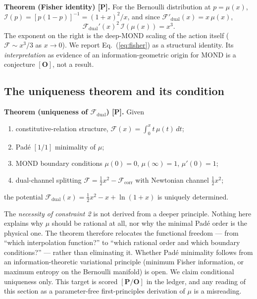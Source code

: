 \documentclass[aps,prd,preprint,superscriptaddress,nofootinbib,amsmath,amssymb,floatfix]{revtex4-2}
\begin{document}
\textbf{Theorem (Fisher identity) [P].} For the Bernoulli distribution at $p = \mu(x)$, $\mathcal{I}(p) = [p(1-p)]^{-1} = (1+x)^2/x$, and since $\mathcal{F}'_{\text{dual}}(x) = x\,\mu(x)$,
\begin{equation}
\label{eq:fisher}
\mathcal{F}_{\text{dual}}'(x)^2\,\mathcal{I}(\mu(x)) = x^3 .
\end{equation}
The exponent on the right is the deep-MOND scaling of the action itself ($\mathcal{F}\sim x^3/3$ as $x\to0$). We report Eq.~(\ref{eq:fisher}) as a structural identity. Its \emph{interpretation} as evidence of an information-geometric origin for MOND is a conjecture $\mathbf{[O]}$, not a result.

\subsection{The uniqueness theorem and its condition}

\textbf{Theorem (uniqueness of $\mathcal{F}_{\text{dual}}$) [P].} Given
\begin{enumerate}
    \item constitutive-relation structure, $\mathcal{F}(x) = \int_0^x t\,\mu(t)\,dt$;
    \item Pad\'e $[1/1]$ minimality of $\mu$;
    \item MOND boundary conditions $\mu(0)=0$, $\mu(\infty)=1$, $\mu'(0)=1$;
    \item dual-channel splitting $\mathcal{F} = \tfrac{1}{2}x^2 - \mathcal{F}_{\text{corr}}$ with Newtonian channel $\tfrac{1}{2}x^2$;
\end{enumerate}
the potential $\mathcal{F}_{\text{dual}}(x) = \tfrac{1}{2}x^2 - x + \ln(1+x)$ is uniquely determined.

\begin{tcolorbox}[colback=boxbg,colframe=primary,title=\textbf{What this theorem does not claim $\mathbf{[O]}$}]
The \emph{necessity of constraint 2} is not derived from a deeper principle. Nothing here explains why $\mu$ should be rational at all, nor why the minimal Pad\'e order is the physical one. The theorem therefore relocates the functional freedom --- from ``which interpolation function?'' to ``which rational order and which boundary conditions?'' --- rather than eliminating it. Whether Pad\'e minimality follows from an information-theoretic variational principle (minimum Fisher information, or maximum entropy on the Bernoulli manifold) is open. We claim conditional uniqueness only. This target is scored $\mathbf{[P/O]}$ in the ledger, and any reading of this section as a parameter-free first-principles derivation of $\mu$ is a misreading.
\end{tcolorbox}
\end{document}

